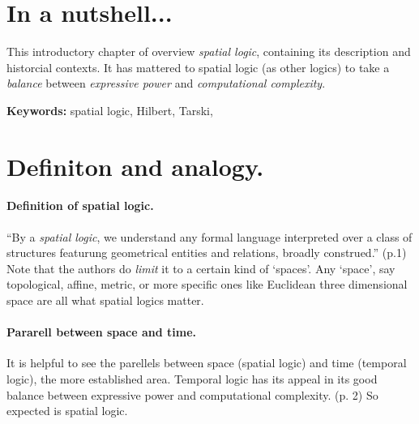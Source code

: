 \documentclass[
10pt, %
a4paper, %
twocolumn, %
landscape %
]{article}
\begin{document}
\pagestyle{myheadings} %
\markright{\doctitle} %


\thispagestyle{plain} %

\printtitle %


\section*{In a nutshell... }
This introductory chapter of \cite{VanBenthem2007} overview \emph{spatial logic}, containing its description and historcial contexts.
It has mattered to spatial logic (as other logics) to take a \emph{balance} between \emph{expressive power} and \emph{computational complexity}.

\noindent \textbf{Keywords:} spatial logic, Hilbert, Tarski,

\section*{Definiton and analogy.}
\paragraph{Definition of spatial logic.}
``By a \textit{spatial logic}, we understand any formal language interpreted over a class of structures featurung geometrical entities and relations, broadly construed.'' (p.1)
Note that the authors do \emph{limit} it to a certain kind of `spaces'. Any `space', say topological, affine, metric, or more specific ones like Euclidean  three dimensional space are all what spatial logics matter.

\paragraph{Pararell between space and time.}
It is helpful to see the parellels between space (spatial logic) and time (temporal logic), the more established area.
Temporal logic has its appeal in its good balance between expressive power and computational complexity. (p. 2)
So expected is spatial logic.
\end{document}
